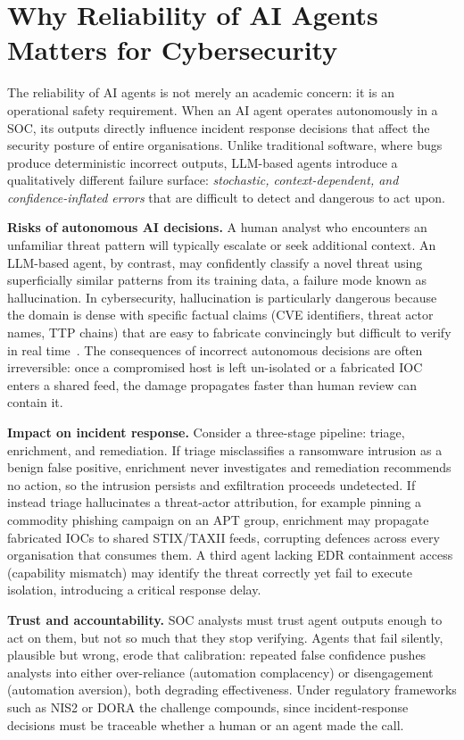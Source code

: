 \section{Why Reliability of AI Agents Matters for Cybersecurity}

The reliability of AI agents is not merely an academic concern: it is an
operational safety requirement. When an AI agent operates autonomously in a
SOC, its outputs directly influence incident response decisions that affect
the security posture of entire organisations. Unlike traditional software,
where bugs produce deterministic incorrect outputs, LLM-based agents
introduce a qualitatively different failure surface: \textit{stochastic,
context-dependent, and confidence-inflated errors} that are difficult to
detect and dangerous to act upon.

\textbf{Risks of autonomous AI decisions.}
A human analyst who encounters an unfamiliar threat pattern will typically
escalate or seek additional context. An LLM-based agent, by contrast, may
confidently classify a novel threat using superficially similar patterns from
its training data, a failure mode known as hallucination. In cybersecurity,
hallucination is particularly dangerous because the domain is dense with
specific factual claims (CVE identifiers, threat actor names, TTP chains)
that are easy to fabricate convincingly but difficult to verify in
real time~\cite{llmagent_halluc_survey2025}. The consequences of
incorrect autonomous decisions are often irreversible: once a compromised
host is left un-isolated or a fabricated IOC enters a shared feed, the damage
propagates faster than human review can contain it.

\textbf{Impact on incident response.}
Consider a three-stage pipeline: triage, enrichment, and remediation.
If triage misclassifies a ransomware intrusion as a benign false
positive, enrichment never investigates and remediation recommends no
action, so the intrusion persists and exfiltration proceeds undetected.
If instead triage hallucinates a threat-actor attribution, for example
pinning a commodity phishing campaign on an APT group, enrichment may
propagate fabricated IOCs to shared STIX/TAXII feeds, corrupting
defences across every organisation that consumes them. A third agent
lacking EDR containment access (capability mismatch) may identify the
threat correctly yet fail to execute isolation, introducing a critical
response delay.

\textbf{Trust and accountability.}
SOC analysts must trust agent outputs enough to act on them, but not so
much that they stop verifying. Agents that fail silently, plausible but
wrong, erode that calibration: repeated false confidence pushes analysts
into either over-reliance (automation complacency) or disengagement
(automation aversion), both degrading effectiveness. Under regulatory
frameworks such as NIS2 or DORA the challenge compounds, since
incident-response decisions must be traceable whether a human or an agent
made the call.

